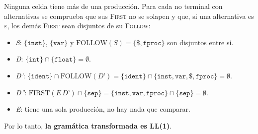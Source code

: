 \documentclass[12pt,letterpaper]{article}
\newcommand{\nt}[1]{\textit{#1}}
\newcommand{\tk}[1]{\texttt{#1}}
\newcommand{\First}[1]{\mathrm{FIRST}(#1)}
\newcommand{\Follow}[1]{\mathrm{FOLLOW}(#1)}
\newcommand{\eps}{\varepsilon}
\begin{document}
\begin{enumerate}[label=\arabic*.]
\begin{itemize}
    Ninguna celda tiene más de una producción. Para cada no terminal con alternativas se comprueba que sus
    \textsc{First} no se solapen y que, si una alternativa es $\eps$, los demás \textsc{First} sean disjuntos
    de su \textsc{Follow}:
    \begin{itemize}
    \item \nt{S}: $\{\tk{inst}\}$, $\{\tk{var}\}$ y $\Follow{\nt{S}}=\{\tk{\$},\tk{fproc}\}$ son disjuntos
      entre sí.
    \item \nt{D}: $\{\tk{int}\}\cap\{\tk{float}\}=\emptyset$.
    \item \nt{D'}: $\{\tk{ident}\}\cap\Follow{\nt{D'}}=\{\tk{ident}\}\cap\{\tk{inst},\tk{var},\tk{\$},\tk{fproc}\}=\emptyset$.
    \item \nt{D''}: $\First{\nt{E}\,\nt{D'}}\cap\{\tk{sep}\}=\{\tk{inst},\tk{var},\tk{fproc}\}\cap\{\tk{sep}\}=\emptyset$.
    \item \nt{E}: tiene una sola producción, no hay nada que comparar.
    \end{itemize}

    Por lo tanto, \textbf{la gramática transformada es LL(1)}.
    
  \end{itemize}
  
\end{enumerate}
\end{document}
